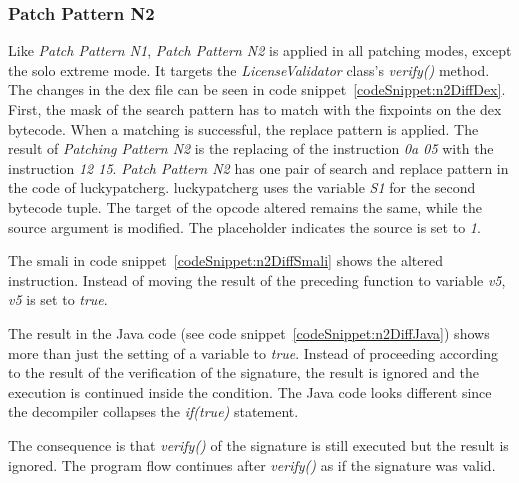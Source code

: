 \subsubsection{Patch Pattern N2}
Like \textit{Patch Pattern N1}, \textit{Patch Pattern N2} is applied in all patching modes, except the solo extreme mode.
It targets the \textit{LicenseValidator} class's \textit{verify()} method.
\newline
The changes in the \gls{dex} file can be seen in code snippet~\ref{codeSnippet:n2DiffDex}.
First, the mask of the search pattern has to match with the fixpoints on the dex bytecode.
When a matching is successful, the replace pattern is applied.
The result of \textit{Patching Pattern N2} is the replacing of the instruction \textit{0a 05} with the instruction \textit{12 15}.
\textit{Patch Pattern N2} has one pair of search and replace pattern in the code of \gls{luckypatcherg}.
\gls{luckypatcherg} uses the variable \textit{S1} for the second bytecode tuple.
The target of the opcode altered remains the same, while the source argument is modified.
The placeholder indicates the source is set to \textit{1}.

The smali in code snippet~\ref{codeSnippet:n2DiffSmali} shows the altered instruction.
Instead of moving the result of the preceding function to variable \textit{v5}, \textit{v5} is set to \textit{true}.

The result in the Java code (see code snippet~\ref{codeSnippet:n2DiffJava}) shows more than just the setting of a variable to \textit{true}.
Instead of proceeding according to the result of the verification of the signature, the result is ignored and the execution is continued inside the condition.
The Java code looks different since the decompiler collapses the \textit{if(true)} statement.

The consequence is that \textit{verify()} of the signature is still executed but the result is ignored.
The program flow continues after  \textit{verify()} as if the signature was valid.

